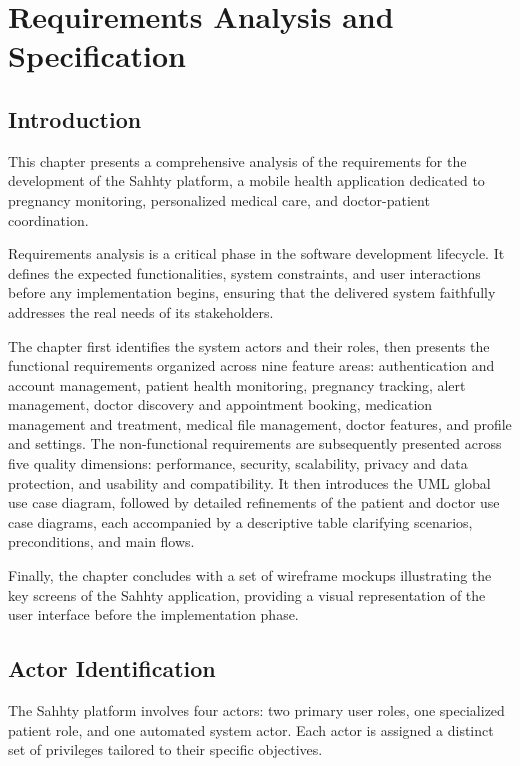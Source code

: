 ﻿\chapter{Requirements Analysis and Specification}

\section{Introduction}

This chapter presents a comprehensive analysis of the requirements for the development
of the Sahhty platform, a mobile health application dedicated to pregnancy monitoring,
personalized medical care, and doctor-patient coordination.

Requirements analysis is a critical phase in the software development lifecycle. It defines
the expected functionalities, system constraints, and user interactions before any
implementation begins, ensuring that the delivered system faithfully addresses the real
needs of its stakeholders.

The chapter first identifies the system actors and their roles, then presents
the functional requirements organized across nine feature areas: authentication
and account management, patient health monitoring, pregnancy tracking, alert
management, doctor discovery and appointment booking, medication management
and treatment, medical file management, doctor features, and profile and
settings. The non-functional requirements are subsequently presented across
five quality dimensions: performance, security, scalability, privacy and data
protection, and usability and compatibility. It then introduces the UML global
use case diagram, followed by detailed refinements of the patient and doctor
use case diagrams, each accompanied by a descriptive table clarifying
scenarios, preconditions, and main flows.


Finally, the chapter concludes with a set of wireframe mockups illustrating
the key screens of the Sahhty application, providing a visual representation
of the user interface before the implementation phase.

\section{Actor Identification}

The Sahhty platform involves four actors: two primary user roles, one specialized patient
role, and one automated system actor. Each actor is assigned a distinct set of privileges
tailored to their specific objectives.

